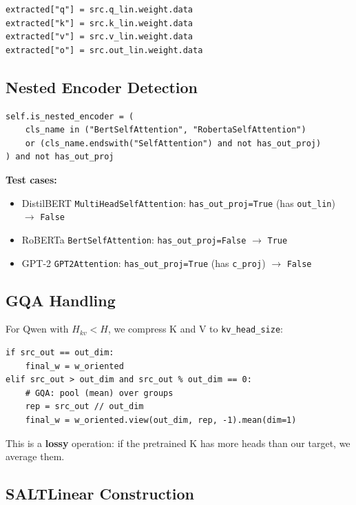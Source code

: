 \begin{lstlisting}
extracted["q"] = src.q_lin.weight.data
extracted["k"] = src.k_lin.weight.data
extracted["v"] = src.v_lin.weight.data
extracted["o"] = src.out_lin.weight.data
\end{lstlisting}

\subsection{Nested Encoder Detection}

\begin{lstlisting}
self.is_nested_encoder = (
    cls_name in ("BertSelfAttention", "RobertaSelfAttention")
    or (cls_name.endswith("SelfAttention") and not has_out_proj)
) and not has_out_proj
\end{lstlisting}

\textbf{Test cases:}
\begin{itemize}
\item DistilBERT \texttt{MultiHeadSelfAttention}: \texttt{has\_out\_proj=True} (has \texttt{out\_lin}) $\to$ \texttt{False}
\item RoBERTa \texttt{BertSelfAttention}: \texttt{has\_out\_proj=False} $\to$ \texttt{True}
\item GPT-2 \texttt{GPT2Attention}: \texttt{has\_out\_proj=True} (has \texttt{c\_proj}) $\to$ \texttt{False}

\end{itemize}
\subsection{GQA Handling}

For Qwen with $H_{kv} < H$, we compress K and V to \texttt{kv\_head\_size}:

\begin{lstlisting}
if src_out == out_dim:
    final_w = w_oriented
elif src_out > out_dim and src_out % out_dim == 0:
    # GQA: pool (mean) over groups
    rep = src_out // out_dim
    final_w = w_oriented.view(out_dim, rep, -1).mean(dim=1)
\end{lstlisting}

This is a \textbf{lossy} operation: if the pretrained K has more heads than our 
target, we average them.

\subsection{SALTLinear Construction}

